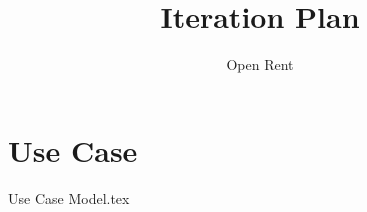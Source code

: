\documentclass[a4paper,11pt]{book}
\title{Iteration Plan}
\author{Open Rent}
\begin{document}
\chapter{Use Case}
 {Use Case Model.tex}
\end{document}
